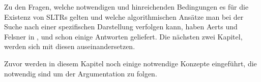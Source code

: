 Zu den Fragen, welche notwendigen und hinreichenden Bedingungen es für die Existenz von SLTRs gelten und  welche algorithmischen Ansätze man bei der Suche nach einer spezifischen Darstellung verfolgen kann, haben Aerts und Felsner in \cite{af13}, \cite{af13h} und \cite{af15} schon einige Antworten geliefert. Die nächsten zwei Kapitel, werden sich mit diesen auseinandersetzen. 

Zuvor werden in diesem Kapitel noch einige notwendige Konzepte eingeführt, die notwendig sind um der Argumentation zu folgen.

